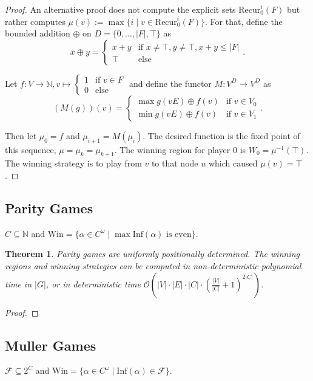 \documentclass{article}
\newtheorem{theorem}{Theorem}
\begin{document}
\begin{proof}
	An alternative proof does not compute the explicit sets $\text{Recur}^i_0(F)$ but rather computes $\mu(v) := \max \{i \mid v \in \text{Recur}^i_0(F)\}$. For that, define the bounded addition $\oplus$ on $D = \{0, \dots, |F|, \top\}$ as 
	$$x \oplus y = \begin{cases} x+y & \text{if } x \neq \top, y \neq \top, x+y \leq |F| \\ \top & \text{else} \end{cases}.$$
	
	Let $f : V \rightarrow \mathbb{N}, v \mapsto \begin{cases} 1 & \text{if } v \in F \\ 0 & \text{else} \end{cases}$ and define the functor $M : V^D \rightarrow V^D$ as
	$$ (M(g))(v) = \begin{cases}
		\max g(vE) \oplus f(v) & \text{if } v \in V_0 \\
		\min g(vE) \oplus f(v) & \text{if } v \in V_1
	\end{cases}. $$
	
	Then let $\mu_0 = f$ and $\mu_{i+1} = M(\mu_i)$. The desired function is the fixed point of this sequence, $\mu = \mu_k = \mu_{k+1}$. The winning region for player 0 is $W_0 = \mu^{-1}(\top)$. The winning strategy is to play from $v$ to that node $u$ which caused $\mu(v) = \top$.
\end{proof}

\subsection{Parity Games}
$C \subseteq \mathbb{N}$ and $\text{Win} = \{ \alpha \in C^\omega \mid \max \text{Inf}(\alpha) \text{ is even}\}$.

\begin{theorem}
	Parity games are uniformly positionally determined. The winning regions and winning strategies can be computed in non-deterministic polynomial time in $|G|$, or in deterministic time $\mathcal{O}\left(|V| \cdot |E| \cdot |C| \cdot (\frac{|V|}{|C|} + 1)^{2|C|}\right)$.
\end{theorem}
\begin{proof}
\end{proof}

\subsection{Muller Games}
$\mathcal{F} \subseteq 2^C$ and $\text{Win} = \{ \alpha \in C^\omega \mid \text{Inf}(\alpha) \in \mathcal{F} \}$.
\end{document}
